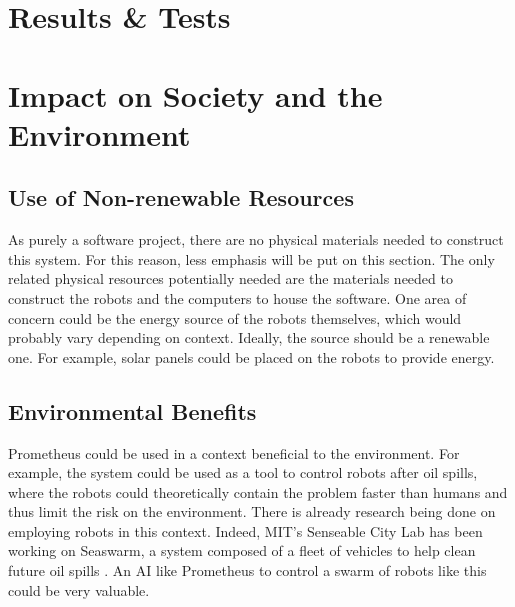 \documentclass[titlepage,11pt]{article}
\begin{document}
\section{Results \& Tests}
\label{sec:results}

\section{Impact on Society and the Environment}
\label{sec:impact}


\subsection{Use of Non-renewable Resources}

As purely a software project, there are no physical materials needed to construct this system. For this reason, less emphasis will be put on this section. The only related physical resources potentially needed are the materials needed to construct the robots and the computers to house the software. One area of concern could be the energy source of the robots themselves, which would probably vary depending on context. Ideally, the source should be a renewable one. For example, solar panels could be placed on the robots to provide energy.

\subsection{Environmental Benefits}

Prometheus could be used in a context beneficial to the environment. For example, the system could be used as a tool to control robots after oil spills, where the robots could theoretically contain the problem faster than humans and thus limit the risk on the environment. There is already research being done on employing robots in this context. Indeed, MIT's Senseable City Lab has been working on Seaswarm, a system composed of a fleet of vehicles to help clean future oil spills \cite{seaswarm}. An AI like Prometheus to control a swarm of robots like this could be very valuable. 
\end{document}

